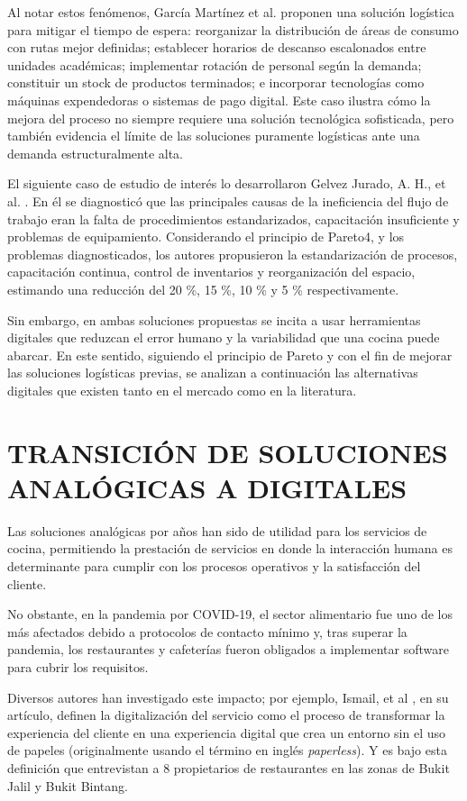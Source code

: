 Al notar estos fenómenos, García Martínez et al. proponen una solución logística para mitigar el tiempo de espera: reorganizar la distribución de áreas de consumo con rutas mejor definidas; establecer horarios de descanso escalonados entre unidades académicas; implementar rotación de personal según la demanda; constituir un stock de productos terminados; e incorporar tecnologías como máquinas expendedoras o sistemas de pago digital. Este caso ilustra cómo la mejora del proceso no siempre requiere una solución tecnológica sofisticada, pero también evidencia el límite de las soluciones puramente logísticas ante una demanda estructuralmente alta.

El siguiente caso de estudio de interés lo desarrollaron Gelvez Jurado, A. H., et al. \cite{gelvez2024estudio}. En él se diagnosticó que las principales causas de la ineficiencia del flujo de trabajo eran la falta de procedimientos estandarizados, capacitación insuficiente y problemas de equipamiento. Considerando el principio de Pareto4, y los problemas diagnosticados, los autores propusieron la estandarización de procesos, capacitación continua, control de inventarios y reorganización del espacio, estimando una reducción del 20 \%, 15 \%, 10 \% y 5 \% respectivamente.

Sin embargo, en ambas soluciones propuestas se incita a usar herramientas digitales que reduzcan el error humano y la variabilidad que una cocina puede abarcar. En este sentido, siguiendo el principio de Pareto y con el fin de mejorar las soluciones logísticas previas, se analizan a continuación las alternativas digitales que existen tanto en el mercado como en la literatura.

\section{TRANSICIÓN DE SOLUCIONES ANALÓGICAS A DIGITALES}

Las soluciones analógicas por años han sido de utilidad para los servicios de cocina, permitiendo la prestación de servicios en donde la interacción humana es determinante para cumplir con los procesos operativos y la satisfacción del cliente.  

No obstante, en la pandemia por COVID-19, el sector alimentario fue uno de los más afectados debido a protocolos de contacto mínimo y, tras superar la pandemia, los restaurantes y cafeterías fueron obligados a implementar software para cubrir los requisitos. 

Diversos autores han investigado este impacto; por ejemplo, Ismail, et al \cite{ismail2025perceived}, en su artículo, definen la digitalización del servicio como el proceso de transformar la experiencia del cliente en una experiencia digital que crea un entorno sin el uso de papeles (originalmente usando el término en inglés \textit{paperless}). Y es bajo esta definición que entrevistan a 8 propietarios de restaurantes en las zonas de Bukit Jalil y Bukit Bintang. 

